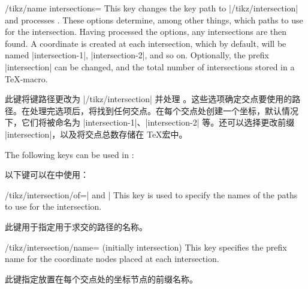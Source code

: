 \begin{key}{/tikz/name intersections=}
    This key changes the key path to |/tikz/intersection| and processes
    . These options determine, among other things, which paths to
    use for the intersection. Having processed the options, any intersections
    are then found. A coordinate is created at each intersection, which by
    default, will be named |intersection-1|, |intersection-2|, and so on.
    Optionally, the prefix |intersection| can be changed, and the total number
    of intersections stored in a \TeX-macro.

    此键将键路径更改为 |/tikz/intersection| 并处理 。这些选项确定交点要使用的路径。在处理完选项后，将找到任何交点。在每个交点处创建一个坐标，默认情况下，它们将被命名为 |intersection-1|、|intersection-2| 等。还可以选择更改前缀 |intersection|，以及将交点总数存储在 \TeX 宏中。


\begin{codeexample}[preamble={\usetikzlibrary{intersections}}]
\end{codeexample}

    The following keys can be used in :

    以下键可以在中使用：


    \begin{key}{/tikz/intersection/of=| and |}
        This key is used to specify the names of the paths to use for the
        intersection.

        此键用于指定用于求交的路径的名称。
    \end{key}

    \begin{key}{/tikz/intersection/name= (initially intersection)}
        This key specifies the prefix name for the coordinate nodes placed at
        each intersection.

        此键指定放置在每个交点处的坐标节点的前缀名称。
    \end{key}


\end{key}
